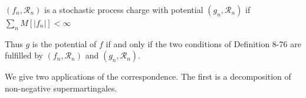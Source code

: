 $(f_n, \mathcal{R}_n)$ is a stochastic process charge with potential $(g_n, \mathcal{R}_n)$ if $\sum_n M[|f_n|] < \infty$

Thus $g$ is the potential of $f$ if and only if the two conditions of Definition 8-76 are fulfilled by $(f_n, \mathcal{R}_n)$ and $(g_n, \mathcal{R}_n)$.

We give two applications of the correspondence. The first is a decomposition of non-negative supermartingales.

